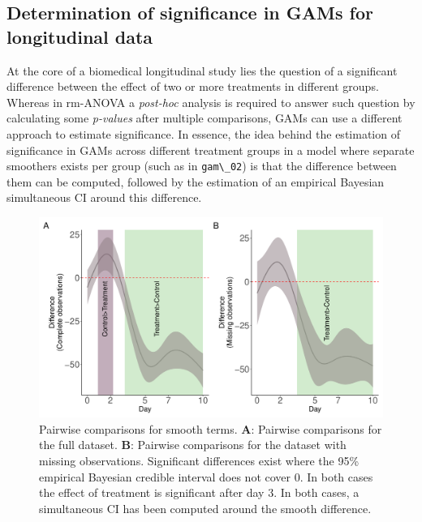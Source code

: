 \documentclass[
]{article}
\newcommand{\passthrough}[1]{#1}
\begin{document}
\hypertarget{GAM-significance}{%
\subsection{Determination of significance in GAMs for longitudinal data}\label{GAM-significance}}

At the core of a biomedical longitudinal study lies the question of a significant difference between the effect of two or more treatments in different groups. Whereas in rm-ANOVA a \emph{post-hoc} analysis is required to answer such question by calculating some \emph{p-values} after multiple comparisons, GAMs can use a different approach to estimate significance. In essence, the idea behind the estimation of significance in GAMs across different treatment groups in a model where separate smoothers exists per group (such as in \passthrough{\lstinline!gam\_02!}) is that the difference between them can be computed, followed by the estimation of an empirical Bayesian simultaneous CI around this difference.



\begin{figure}

{\centering \includegraphics[width=1\linewidth]{Full_document_SIM_No_Appendix_files/figure-latex/plot-pairwise-comp-1} 

}

\caption{Pairwise comparisons for smooth terms. \textbf{A}: Pairwise comparisons for the full dataset. \textbf{B}: Pairwise comparisons for the dataset with missing observations. Significant differences exist where the 95\% empirical Bayesian credible interval does not cover 0. In both cases the effect of treatment is significant after day 3. In both cases, a simultaneous CI has been computed around the smooth difference.}\label{fig:plot-pairwise-comp}
\end{figure}
\end{document}
